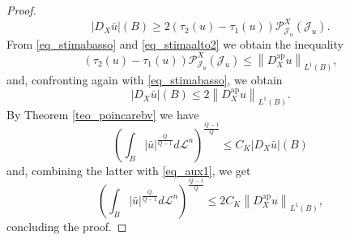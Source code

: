 \documentclass[12pt,a4paper]{amsart}
\theoremstyle{definition}
\theoremstyle{plain}
\newcommand{\pxu}{{\mathcal{P}^X_{\mathcal{J}_u}}}
\newcommand{\leb}{\mathcal{L}}
\newcommand{\J}{\mathcal{J}}
\newcommand{\nl}{\left\|}
\newcommand{\nr}{\right\|}
\newcommand{\ap}{{\operatorname{ap}}}
\begin{document}
\begin{proof}
\begin{equation}
    |D_X\bar u|(B) \geq 2 (\tau_2(u)-\tau_1(u))\pxu(\J_u).
\end{equation}
From \eqref{eq_stimabasso} and \eqref{eq_stimaalto2} we obtain the inequality
\[
(\tau_2(u)-\tau_1(u))\pxu(\J_u) \leq  \nl D_X^\ap u \nr_{L^1(B)},
\]
and, confronting again with \eqref{eq_stimabasso}, we obtain
\begin{equation}\label{eq_aux1}
|D_X \bar u|(B) \leq 2  \nl D_X^\ap  u \nr_{L^1(B)}.
\end{equation}
By Theorem \ref{teo_poincarebv} we have
\[
\left( \int_B | \bar u|^\frac{Q}{Q-1}d\leb^n  \right)^\frac{Q-1}{Q} \leq C_K|D_X \bar u|(B)
\]
and, combining the latter with \eqref{eq_aux1}, we get
\[
\left(  \int_B |\bar u|^\frac{Q}{Q-1} d\leb^n  \right)^\frac{Q-1}{Q} \leq 2C_K  \nl D^\ap_X u \nr_{L^1(B)},
\]
concluding the proof.
\end{proof}
\end{document}
